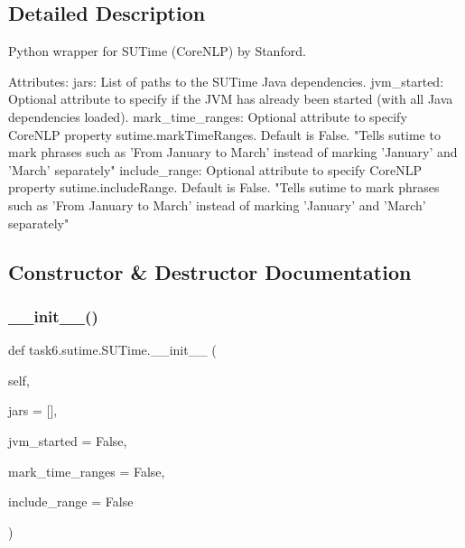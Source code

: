 \subsection{Detailed Description}
\begin{DoxyVerb}Python wrapper for SUTime (CoreNLP) by Stanford.

Attributes:
    jars: List of paths to the SUTime Java dependencies.
    jvm_started: Optional attribute to specify if the JVM has already been
        started (with all Java dependencies loaded).
    mark_time_ranges: Optional attribute to specify CoreNLP property
        sutime.markTimeRanges. Default is False.
        "Tells sutime to mark phrases such as 'From January to March'
        instead of marking 'January' and 'March' separately"
    include_range: Optional attribute to specify CoreNLP property
        sutime.includeRange. Default is False.
        "Tells sutime to mark phrases such as 'From January to March'
        instead of marking 'January' and 'March' separately"
\end{DoxyVerb}
 

\subsection{Constructor \& Destructor Documentation}
\mbox{\label{classtask6_1_1sutime_1_1SUTime_ad3d2f079441d91580b76c08e8cbbc01c}} 
\subsubsection{\texorpdfstring{\+\_\+\+\_\+init\+\_\+\+\_\+()}{\_\_init\_\_()}}
{\footnotesize\ttfamily def task6.\+sutime.\+S\+U\+Time.\+\_\+\+\_\+init\+\_\+\+\_\+ (\begin{DoxyParamCaption}\item[{}]{self,  }\item[{}]{jars = {\ttfamily \mbox{[}\mbox{]}},  }\item[{}]{jvm\+\_\+started = {\ttfamily False},  }\item[{}]{mark\+\_\+time\+\_\+ranges = {\ttfamily False},  }\item[{}]{include\+\_\+range = {\ttfamily False} }\end{DoxyParamCaption})}

